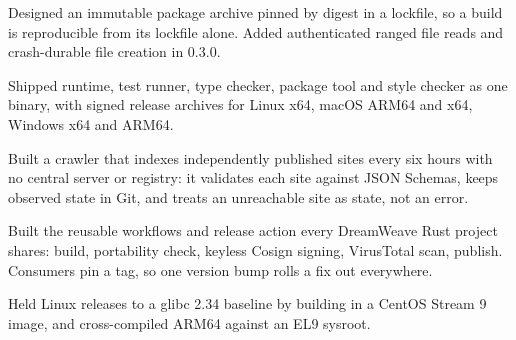 \documentclass{resume}
\begin{document}
\begin{bullets}
  \item Designed an immutable package archive pinned by digest in a lockfile, so a build is reproducible from its lockfile alone. Added authenticated ranged file reads and crash-durable file creation in 0.3.0.
  \item Shipped runtime, test runner, type checker, package tool and style checker as one binary, with signed release archives for Linux x64, macOS ARM64 and x64, Windows x64 and ARM64.
\end{bullets}

\begin{bullets}
  \item Built a crawler that indexes independently published sites every six hours with no central server or registry: it validates each site against JSON Schemas, keeps observed state in Git, and treats an unreachable site as state, not an error.
\end{bullets}

\begin{bullets}
  \item Built the reusable workflows and release action every DreamWeave Rust project shares: build, portability check, keyless Cosign signing, VirusTotal scan, publish. Consumers pin a tag, so one version bump rolls a fix out everywhere.
  \item Held Linux releases to a glibc 2.34 baseline by building in a CentOS Stream 9 image, and cross-compiled ARM64 against an EL9 sysroot.
\end{bullets}
\end{document}
